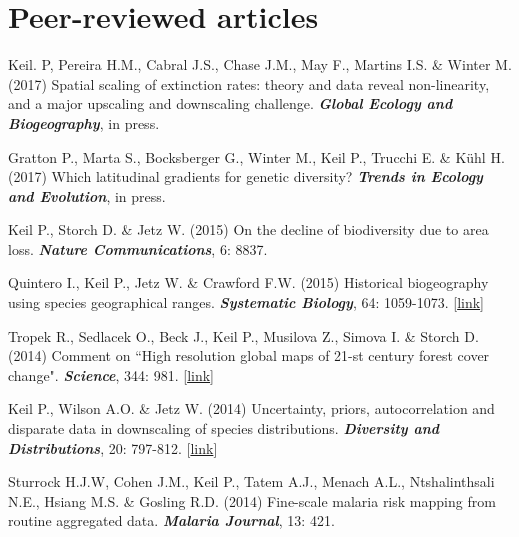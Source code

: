 \newpage

\HRule

\section{Peer-reviewed articles}

\begin{etaremune}

\item Keil. P, Pereira H.M., Cabral J.S., Chase J.M., May F., Martins I.S. \& Winter M. (2017) Spatial scaling of extinction rates: theory and data reveal non-linearity, and a major upscaling and downscaling challenge. \textit{\textbf{Global Ecology and Biogeography}}, in press.


\item Gratton P., Marta S., Bocksberger G., Winter M., Keil P., Trucchi E. \& Kühl H. (2017) Which latitudinal gradients for genetic diversity? \textit{\textbf{Trends in Ecology and Evolution}}, in press.

\item Keil P., Storch D. \& Jetz W. (2015) On the decline of biodiversity due to area loss. \textit{\textbf{Nature Communications}}, 6: 8837.

\item Quintero I., Keil P., Jetz W. \& Crawford F.W. (2015) Historical biogeography using species geographical ranges. \textit{\textbf{Systematic Biology}}, 64: 1059-1073. [\href{http://sysbio.oxfordjournals.org/content/64/6/1059.short}{link}] 

\item Tropek R., Sedlacek O., Beck J., Keil P., Musilova Z., Simova I. \& Storch D. (2014) Comment on ``High resolution global maps of 21-st century forest cover change". \textit{\textbf{Science}}, 344: 981. [\href{http://www.sciencemag.org/content/344/6187/981.4.full}{link}] 

\item Keil P., Wilson A.O. \& Jetz W. (2014) Uncertainty, priors, autocorrelation and disparate data in downscaling of species distributions. \textit{\textbf{Diversity and Distributions}}, 20: 797-812. [\href{http://onlinelibrary.wiley.com/doi/10.1111/ddi.12199/abstract}{link}]

\item Sturrock H.J.W, Cohen J.M., Keil P., Tatem A.J., Menach A.L., Ntshalinthsali N.E., Hsiang M.S. \& Gosling R.D. (2014) Fine-scale malaria risk mapping from routine aggregated data. \textit{\textbf{Malaria Journal}}, 13: 421.


\end{etaremune}
